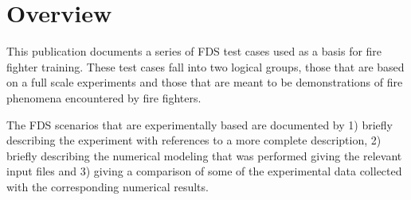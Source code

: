 \documentclass[11pt]{book}
\begin{document}
\section{Overview}
This publication documents a series of FDS test cases used as a basis for fire fighter training. These test cases fall into two logical groups, those that are based on a full scale experiments and those that are meant to be demonstrations of fire phenomena encountered by fire fighters.

The FDS scenarios that are experimentally based are documented by 1) briefly describing the experiment with references to a more complete description, 2) briefly describing the numerical modeling that was performed giving the relevant input files and 3) giving a comparison of some of the experimental data collected with the corresponding numerical results.




%











%



\appendix
\end{document}
